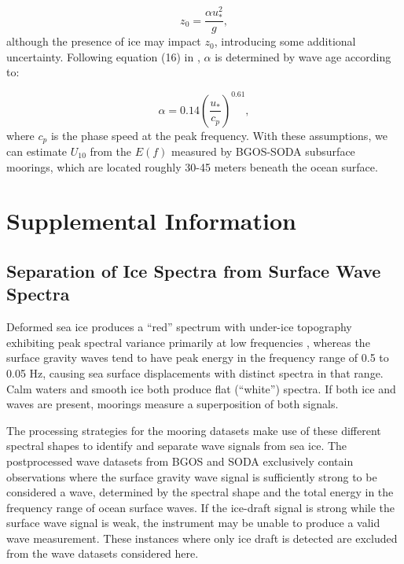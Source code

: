 \documentclass [11pt, proquest] {uwthesis}[2020/02/24]
\begin{document}
\begin{equation}
z_0 =  \frac{\alpha u_{\ast}^2}{g},
\label{eq:z_0}
\end{equation}
\noindent
although the presence of ice may impact $z_0$, introducing some additional uncertainty. Following equation (16) in \cite{Voermans2020EstimatingSpectra}, $\alpha$ is determined by wave age according to:

\begin{equation}
\alpha =  0.14 \left( \frac{u_{\ast}}{c_p} \right)^{0.61},
\label{eq:charnock}
\end{equation}
\noindent
where $c_p$ is the phase speed at the peak frequency. With these assumptions, we can estimate $U_{10}$ from the $E(f)$ measured by BGOS-SODA subsurface moorings, which are located roughly 30-45 meters beneath the ocean surface.  

\chapter{Supplemental Information}\label{SI}
\section{Separation of Ice Spectra from Surface Wave Spectra} \label{icespectra}

Deformed sea ice produces a ``red'' spectrum with under-ice topography exhibiting peak spectral variance primarily at low frequencies \cite{Rothrock1980GeometricIce}, whereas the surface gravity waves tend to have peak energy in the frequency range of 0.5 to 0.05 Hz, causing sea surface displacements with distinct spectra in that range. Calm waters and smooth ice both produce flat (``white'') spectra. If both ice and waves are present, moorings measure a superposition of both signals.  

The processing strategies for the mooring datasets make use of these different spectral shapes to identify and separate wave signals from sea ice. The postprocessed wave datasets from BGOS and SODA exclusively contain observations where the surface gravity wave signal is sufficiently strong to be considered a wave, determined by the spectral shape and the total energy in the frequency range of ocean surface waves. If the ice-draft signal is strong while the surface wave signal is weak, the instrument may be unable to produce a valid wave measurement. These instances where only ice draft is detected are excluded from the wave datasets considered here.  
\end{document}
